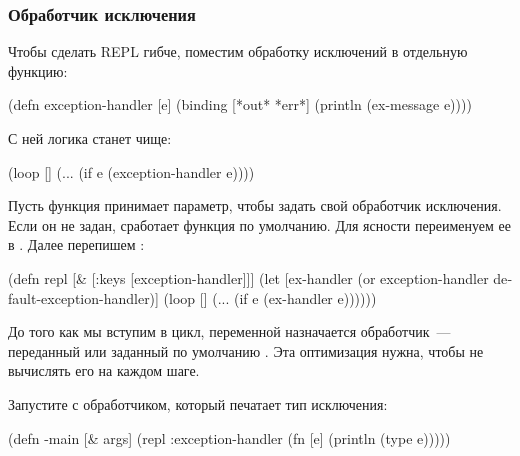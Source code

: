 \subsubsection{Обработчик исключения}

Чтобы сделать REPL гибче, поместим обработку исключений в отдельную функцию:

\begin{english}
  \begin{clojure}
(defn exception-handler [e]
  (binding [*out* *err*]
    (println (ex-message e))))
  \end{clojure}
\end{english}

С ней логика  станет чище:

\begin{english}
  \begin{clojure}
(loop []
  (...
   (if e
     (exception-handler e))))
  \end{clojure}
\end{english}

Пусть функция  принимает параметр, чтобы задать свой обработчик исключения. Если он не задан, сработает функция по умолчанию. Для ясности переименуем ее в . Далее перепишем :

\begin{english}
  \begin{clojure/lines}
(defn repl
  [& [{:keys [exception-handler]}]]
  (let [ex-handler
        (or exception-handler
            default-exception-handler)]
    (loop []
      (...
        (if e
          (ex-handler e))))))
  \end{clojure/lines}
\end{english}

\pagebreaklarge

До того как мы вступим в цикл, переменной  назначается обработчик~--- переданный или заданный по умолчанию . Эта оптимизация нужна, чтобы не вычислять его на каждом шаге.

Запустите  с обработчиком, который печатает тип исключения:

\begin{english}
  \begin{clojure}
(defn -main
  [& args]
  (repl
    {:exception-handler
      (fn [e]
        (println (type e)))}))
  \end{clojure}
\end{english}

